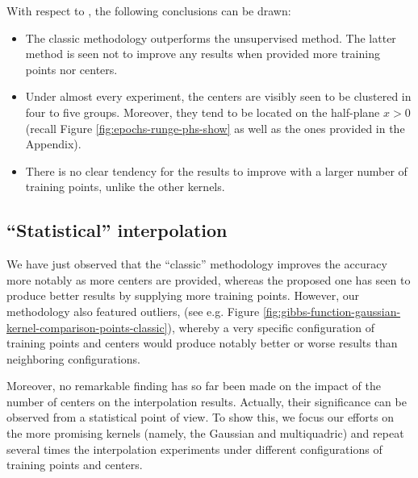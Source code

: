 \documentclass[12pt]{report} %
\newcommand{\tmverbatim}[1]{\text{{\ttfamily{#1}}}}
\begin{document}
With respect to \tmverbatim{phs\_kernel}, the following conclusions can be
drawn:
\begin{itemize}
  \item The classic methodology outperforms the unsupervised method. The
        latter method is seen not to improve any results when provided more training
        points nor centers.

  \item Under almost every experiment, the centers are visibly seen to be
        clustered in four to five groups. Moreover, they tend to be located on the
        half-plane $x > 0$ (recall Figure \ref{fig:epochs-runge-phs-show} as well as
        the ones provided in the Appendix).

  \item There is no clear tendency for the results to improve with a larger
        number of training points, unlike the other kernels. %
\end{itemize}


\clearpage
\subsection{``Statistical'' interpolation}

We have just observed that the ``classic'' methodology improves the accuracy
more notably as more centers are provided,
whereas the proposed one has seen to produce better results by supplying more
training points. However, our methodology also featured outliers,
(see e.g. Figure \ref{fig:gibbs-function-gaussian-kernel-comparison-points-classic}),
whereby a very specific configuration of training points and centers would
produce notably better or worse results than neighboring configurations.

Moreover, no remarkable finding has so far been made on the impact of the number of
centers on the interpolation results. Actually, their significance can be
observed from a statistical point of view. To show this, we focus our efforts on
the more promising kernels (namely, the Gaussian and multiquadric) and repeat several
times the interpolation experiments under different configurations of
training points and centers.
\end{document}
